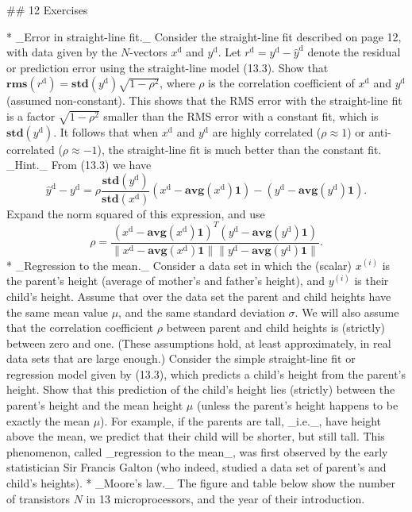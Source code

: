 

## 12 Exercises

* _Error in straight-line fit._ Consider the straight-line fit described on page 12, with data given by the \(N\)-vectors \(x^{\mathrm{d}}\) and \(y^{\mathrm{d}}\). Let \(r^{\mathrm{d}}=y^{\mathrm{d}}-\hat{y}^{\mathrm{d}}\) denote the residual or prediction error using the straight-line model (13.3). Show that \(\mathbf{rms}(r^{\mathrm{d}})=\mathbf{std}(y^{\mathrm{d}})\sqrt{1-\rho^{2}}\), where \(\rho\) is the correlation coefficient of \(x^{\mathrm{d}}\) and \(y^{\mathrm{d}}\) (assumed non-constant). This shows that the RMS error with the straight-line fit is a factor \(\sqrt{1-\rho^{2}}\) smaller than the RMS error with a constant fit, which is \(\mathbf{std}(y^{\mathrm{d}})\). It follows that when \(x^{\mathrm{d}}\) and \(y^{\mathrm{d}}\) are highly correlated (\(\rho\approx 1\)) or anti-correlated (\(\rho\approx-1\)), the straight-line fit is much better than the constant fit. _Hint._ From (13.3) we have \[\hat{y}^{\mathrm{d}}-y^{\mathrm{d}}=\rho\frac{\mathbf{std}(y^{\mathrm{d}})}{ \mathbf{std}(x^{\mathrm{d}})}(x^{\mathrm{d}}-\mathbf{avg}(x^{\mathrm{d}}) \mathbf{1})-(y^{\mathrm{d}}-\mathbf{avg}(y^{\mathrm{d}})\mathbf{1}).\] Expand the norm squared of this expression, and use \[\rho=\frac{(x^{\mathrm{d}}-\mathbf{avg}(x^{\mathrm{d}})\mathbf{1})^{T}(y^{ \mathrm{d}}-\mathbf{avg}(y^{\mathrm{d}})\mathbf{1})}{\|x^{\mathrm{d}}- \mathbf{avg}(x^{\mathrm{d}})\mathbf{1}\|\|y^{\mathrm{d}}-\mathbf{avg}(y^{ \mathrm{d}})\mathbf{1}\|}.\]
* _Regression to the mean._ Consider a data set in which the (scalar) \(x^{(i)}\) is the parent's height (average of mother's and father's height), and \(y^{(i)}\) is their child's height. Assume that over the data set the parent and child heights have the same mean value \(\mu\), and the same standard deviation \(\sigma\). We will also assume that the correlation coefficient \(\rho\) between parent and child heights is (strictly) between zero and one. (These assumptions hold, at least approximately, in real data sets that are large enough.) Consider the simple straight-line fit or regression model given by (13.3), which predicts a child's height from the parent's height. Show that this prediction of the child's height lies (strictly) between the parent's height and the mean height \(\mu\) (unless the parent's height happens to be exactly the mean \(\mu\)). For example, if the parents are tall, _i.e._, have height above the mean, we predict that their child will be shorter, but still tall. This phenomenon, called _regression to the mean_, was first observed by the early statistician Sir Francis Galton (who indeed, studied a data set of parent's and child's heights).
* _Moore's law._ The figure and table below show the number of transistors \(N\) in 13 microprocessors, and the year of their introduction.


